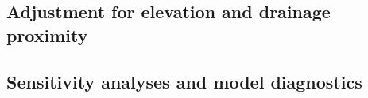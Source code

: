 \subsection{Adjustment for elevation and drainage proximity}
\label{sec:physical-adjustment}


\subsection{Sensitivity analyses and model diagnostics}
\label{sec:sensitivity}
\label{sec:methods-sensitivity}

